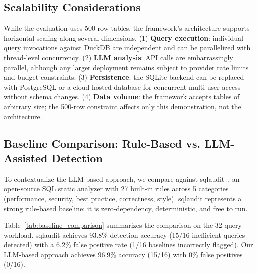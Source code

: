 \documentclass[conference]{IEEEtran}
\begin{document}
\subsection{Scalability Considerations}
\label{sec:scalability}
While the evaluation uses 500-row tables, the framework's architecture supports horizontal scaling along several dimensions. (1) \textbf{Query execution}: individual query invocations against DuckDB are independent and can be parallelized with thread-level concurrency. (2) \textbf{LLM analysis}: API calls are embarrassingly parallel, although any larger deployment remains subject to provider rate limits and budget constraints. (3) \textbf{Persistence}: the SQLite backend can be replaced with PostgreSQL or a cloud-hosted database for concurrent multi-user access without schema changes. (4) \textbf{Data volume}: the framework accepts tables of arbitrary size; the 500-row constraint affects only this demonstration, not the architecture.

\subsection{Baseline Comparison: Rule-Based vs. LLM-Assisted Detection}
\label{sec:baseline_comparison}
To contextualize the LLM-based approach, we compare against sqlaudit~\cite{sqlaudit}, an open-source SQL static analyzer with 27 built-in rules across 5 categories (performance, security, best practice, correctness, style). sqlaudit represents a strong rule-based baseline: it is zero-dependency, deterministic, and free to run.

Table~\ref{tab:baseline_comparison} summarizes the comparison on the 32-query workload. sqlaudit achieves 93.8\% detection accuracy (15/16 inefficient queries detected) with a 6.2\% false positive rate (1/16 baselines incorrectly flagged). Our LLM-based approach achieves 96.9\% accuracy (15/16) with 0\% false positives (0/16).

\begin{table}[t]
\caption{Rule-Based vs. LLM-Assisted Detection Comparison}
\label{tab:baseline_comparison}
\centering
{}
\end{table}
\end{document}
